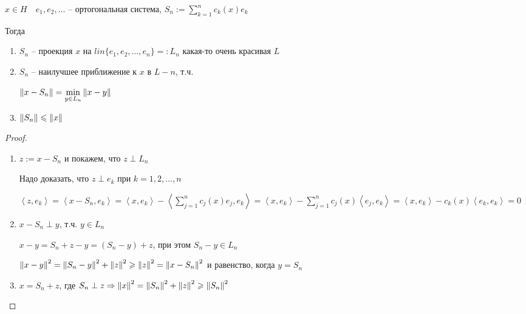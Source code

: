 \begin{theorem}\thmslashn 
	
	$x \in H \quad e_1, e_2, \ldots$ -- ортогональная система,  $S_n:= \sum\limits_{k = 1}^{n} c_k(x)e_k$

	Тогда
	
	\begin{enumerate}
		\item 
		$S_n$ -- проекция $x$ на $lin\{e_1, e_2, \ldots, e_n\} =:L_n$ \TODO какая-то очень красивая $L$
		
		\item
	 	$S_n$ -- наилучшее приближение к $x$ в $L-n$, т.ч. 
	 	
	 	$\left\|x-S_n\right\| = \min\limits_{y \in L_n}\left\|x - y\right\|$
	 	
	 	\item
	 	$\left\|S_n\right\| \leqslant \left\|x\right\|$
		
	\end{enumerate}
\end{theorem}

\begin{proof}\thmslashn

	\begin{enumerate}
		\item 
		$z:= x - S_n$ и покажем, что $z \perp L_n$
		
		Надо доказать, что $z\perp e_k$ при $k = 1, 2, \ldots, n$
		
		$\left\langle z, e_k \right\rangle = \left\langle x - S_n, e_k \right\rangle = \left\langle x, e_k \right\rangle - \left\langle \sum\limits_{j = 1}^{n}c_j(x)e_j, e_k \right\rangle = \left\langle x, e_k \right\rangle - \sum\limits_{j = 1}^{n} c_j(x)\left\langle e_j, e_k \right\rangle = \left\langle x, e_k \right\rangle - c_k(x)\left\langle e_k, e_k \right\rangle = 0$
		
		\item
		$x - S_n \perp y$, т.ч. $y \in L_n$
		
		$x - y = S_n + z - y = (S_n - y) + z$, при этом $S_n - y \in L_n$
		
		$\left\|x - y\right\|^2 = \left\|S_n - y\right\|^2 + \left\|z\right\|^2 \geqslant \left\|z\right\|^2 = \left\|x - S_n\right\|^2$ и равенство, когда $y = S_n$
		
		\item
		$x = S_n + z$, где $S_n \perp z \Rightarrow \left\|x\right\|^2 = \left\|S_n\right\|^2 + \left\|z\right\|^2 \geqslant \left\|S_n\right\|^2$
		
	\end{enumerate}	

\end{proof}

